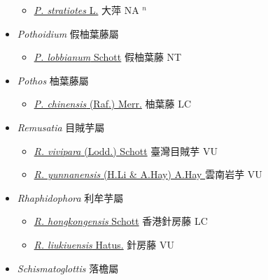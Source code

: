 \begin{itemize}
  \begin{itemize}
        \item[] \href{http://www.theplantlist.org/tpl1.1/search?q=Pistia+stratiotes}{\textit{P. stratiotes} L.}   大萍 NA $^n$
  \end{itemize}
 \item[] \textit{Pothoidium} 假柚葉藤屬
                    
  \begin{itemize}
        \item[] \href{http://www.theplantlist.org/tpl1.1/search?q=Pothoidium+lobbianum}{\textit{P. lobbianum} Schott}   假柚葉藤 NT
  \end{itemize}
 \item[] \textit{Pothos} 柚葉藤屬
                    
  \begin{itemize}
        \item[] \href{http://www.theplantlist.org/tpl1.1/search?q=Pothos+chinensis}{\textit{P. chinensis} (Raf.) Merr.}   柚葉藤 LC
  \end{itemize}
 \item[] \textit{Remusatia} 目賊芋屬
                    
  \begin{itemize}
        \item[] \href{http://www.theplantlist.org/tpl1.1/search?q=Remusatia+vivipara}{\textit{R. vivipara} (Lodd.) Schott}   臺灣目賊芋 VU
        \item[] \href{http://www.theplantlist.org/tpl1.1/search?q=Remusatia+yunnanensis}{\textit{R. yunnanensis} (H.Li \& A.Hay) A.Hay }   雲南岩芋 VU
  \end{itemize}
 \item[] \textit{Rhaphidophora} 利牟芋屬
                    
  \begin{itemize}
        \item[] \href{http://www.theplantlist.org/tpl1.1/search?q=Rhaphidophora+hongkongensis}{\textit{R. hongkongensis} Schott}   香港針房藤 LC
        \item[] \href{http://www.theplantlist.org/tpl1.1/search?q=Rhaphidophora+liukiuensis}{\textit{R. liukiuensis} Hatus.}   針房藤 VU
  \end{itemize}
 \item[] \textit{Schismatoglottis} 落檐屬
                    

\end{itemize}
